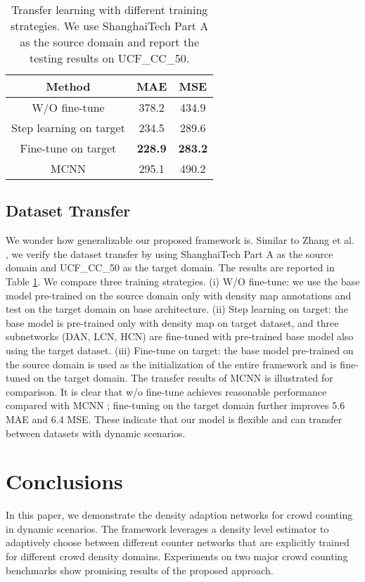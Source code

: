 \documentclass[journal]{IEEEtran}
\begin{document}
\begin{table}[t]
\begin{center}
\caption{Transfer learning with different training strategies. We use ShanghaiTech Part A as the source domain and report the testing results on UCF\_CC\_50.}
\label{tab:transfer}
\begin{tabular}{c|cc }
\hline
Method &MAE&MSE\\
  \hline
  \hline
  W/O fine-tune      &	378.2   &  434.9 \\
  \hline

  Step learning on target & 234.5   &  289.6 \\

  \hline
  Fine-tune on target & \textbf{228.9}   &  \textbf{283.2}   \\
  \hline
  MCNN \cite{Zhang:2016fr} & 295.1  & 490.2   \\
  \hline
\end{tabular}
\end{center}
\vspace{-0.2in}
\end{table}

\subsection{Dataset Transfer}
We wonder how generalizable our proposed framework is. Similar to Zhang et al. \cite{Zhang:2016fr}, we verify the dataset transfer by using ShanghaiTech Part A as the source domain and UCF\_CC\_50 as the target domain.  The results are reported in Table \ref{tab:transfer}. We compare three training strategies. (i) W/O fine-tune: we use the base model pre-trained on the source domain only with density map annotations and test on the target domain on base architecture. (ii) Step learning on target: the base model is pre-trained only with density map on target dataset, and three subnetworks (DAN, LCN, HCN) are fine-tuned with pre-trained base model also using the target dataset. (iii) Fine-tune on target: the base model pre-trained on the source domain is used as the initialization of the entire framework and is fine-tuned on the target domain. The transfer results of MCNN \cite{Zhang:2016fr} is illustrated for comparison. It is clear that w/o fine-tune achieves reasonable performance compared with MCNN \cite{Zhang:2016fr}; fine-tuning on the target domain further improves 5.6 MAE and 6.4 MSE. These indicate that our model is flexible and can transfer between datasets with dynamic scenarios.

\section{Conclusions}
\label{sec:concl}
In this paper, we demonstrate the density adaption networks for crowd counting in dynamic scenarios. The framework leverages a density level estimator to adaptively choose between different counter networks that are explicitly trained for different crowd density domains. Experiments on two major crowd counting benchmarks show promising results of the proposed approach.

\ifCLASSOPTIONcaptionsoff
  \newpage
\fi

\balance


\end{document}
